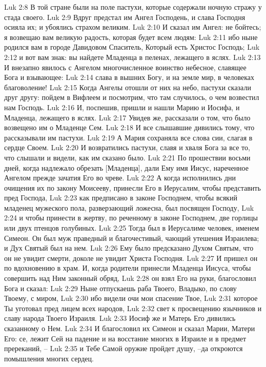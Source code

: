 Luk 2:8  В той стране были на поле пастухи, которые содержали ночную стражу у стада своего.
Luk 2:9  Вдруг предстал им Ангел Господень, и слава Господня осияла их; и убоялись страхом великим.
Luk 2:10  И сказал им Ангел: не бойтесь; я возвещаю вам великую радость, которая будет всем людям:
Luk 2:11  ибо ныне родился вам в городе Давидовом Спаситель, Который есть Христос Господь;
Luk 2:12  и вот вам знак: вы найдете Младенца в пеленах, лежащего в яслях.
Luk 2:13  И внезапно явилось с Ангелом многочисленное воинство небесное, славящее Бога и взывающее:
Luk 2:14  слава в вышних Богу, и на земле мир, в человеках благоволение!
Luk 2:15  Когда Ангелы отошли от них на небо, пастухи сказали друг другу: пойдем в Вифлеем и посмотрим, что там случилось, о чем возвестил нам Господь.
Luk 2:16  И, поспешив, пришли и нашли Марию и Иосифа, и Младенца, лежащего в яслях.
Luk 2:17  Увидев же, рассказали о том, что было возвещено им о Младенце Сем.
Luk 2:18  И все слышавшие дивились тому, что рассказывали им пастухи.
Luk 2:19  А Мария сохраняла все слова сии, слагая в сердце Своем.
Luk 2:20  И возвратились пастухи, славя и хваля Бога за все то, что слышали и видели, как им сказано было.
Luk 2:21  По прошествии восьми дней, когда надлежало обрезать [Младенца], дали Ему имя Иисус, нареченное Ангелом прежде зачатия Его во чреве.
Luk 2:22  А когда исполнились дни очищения их по закону Моисееву, принесли Его в Иерусалим, чтобы представить пред Господа,
Luk 2:23  как предписано в законе Господнем, чтобы всякий младенец мужеского пола, разверзающий ложесна, был посвящен Господу,
Luk 2:24  и чтобы принести в жертву, по реченному в законе Господнем, две горлицы или двух птенцов голубиных.
Luk 2:25  Тогда был в Иерусалиме человек, именем Симеон. Он был муж праведный и благочестивый, чающий утешения Израилева; и Дух Святый был на нем.
Luk 2:26  Ему было предсказано Духом Святым, что он не увидит смерти, доколе не увидит Христа Господня.
Luk 2:27  И пришел он по вдохновению в храм. И, когда родители принесли Младенца Иисуса, чтобы совершить над Ним законный обряд,
Luk 2:28  он взял Его на руки, благословил Бога и сказал:
Luk 2:29  Ныне отпускаешь раба Твоего, Владыко, по слову Твоему, с миром,
Luk 2:30  ибо видели очи мои спасение Твое,
Luk 2:31  которое Ты уготовал пред лицем всех народов,
Luk 2:32  свет к просвещению язычников и славу народа Твоего Израиля.
Luk 2:33  Иосиф же и Матерь Его дивились сказанному о Нем.
Luk 2:34  И благословил их Симеон и сказал Марии, Матери Его: се, лежит Сей на падение и на восстание многих в Израиле и в предмет пререканий, --
Luk 2:35  и Тебе Самой оружие пройдет душу, --да откроются помышления многих сердец.
